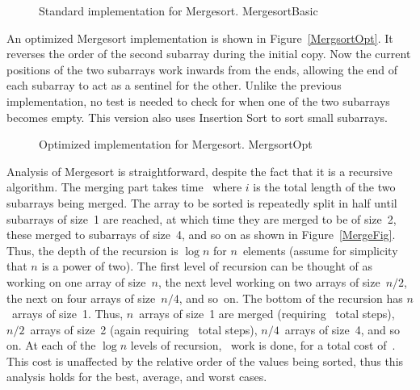 \begin{figure}

\vspace{-\bigskipamount}
\vspace{-\medskipamount}

{Standard implementation for Mergesort.}
{MergesortBasic}
\end{figure}

An optimized Mergesort implementation is shown in
Figure~\ref{MergsortOpt}.
It reverses the order of the second subarray during the initial copy.
Now the current positions of the two subarrays work inwards from the
ends, allowing the end of each subarray to act as a sentinel for the
other.
Unlike the previous implementation, no test is needed to check for
when one of the two subarrays becomes empty.
This version also uses Insertion Sort to sort small subarrays.

\begin{figure}

\vspace{-\bigskipamount}
{Optimized implementation for Mergesort.}
{MergsortOpt}
\end{figure}

Analysis of Mergesort is straightforward, despite the fact that it is
a recursive algorithm.
The merging part takes time \Thetai\ where \(i\)
is the total length of the two subarrays being merged.
The array to be sorted is repeatedly split in half until subarrays of
size~1 are reached, at which time they are merged to be of size~2,
these merged to subarrays of size~4, and so on as shown in
Figure~\ref{MergeFig}.
Thus, the depth of the recursion is \(\log n\) for \(n\)~elements
(assume for simplicity that \(n\) is a power of two).
The first level of recursion can be thought of as working on one array
of size~\(n\), the next level working on two arrays of size~\(n/2\), the
next on four arrays of size~\(n/4\), and so~on.
The bottom of the recursion has \(n\)~arrays of size~1.
Thus, \(n\)~arrays of size~1 are merged (requiring
\Thetan\ total steps), \(n/2\)~arrays of size~2 (again requiring
\Thetan\ total steps), \(n/4\)~arrays of size~4, and so on.
At each of the \(\log n\) levels of recursion, \Thetan\ work is done,
for a total cost of~\Thetanlogn.
This cost is unaffected by the relative order of the
values being sorted, thus this analysis holds for the best, average,
and worst cases.

